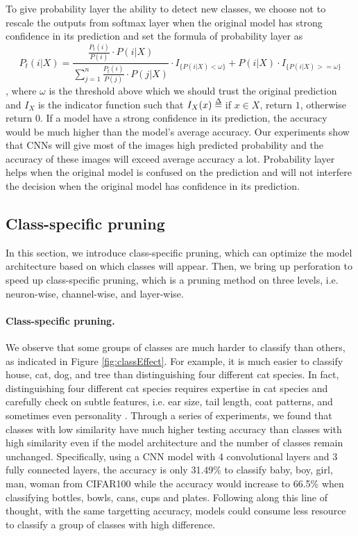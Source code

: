 \documentclass[pageno]{jpaper}
\def\delequal{\mathrel{\ensurestackMath{\stackon[1pt]{=}{\scriptstyle\Delta}}}}
\begin{document}
To give probability layer the ability to detect new classes, we choose not to rescale the outputs from softmax layer when the original model has strong confidence in its prediction and set the formula of probability layer as
\begin{equation} \label{eq: recover}
    P_t(i|X) = \frac{\frac{P_t(i)}{P(i)} \cdot P(i|X)}{\sum_{j=1}^n \frac{P_t(i)}{P(j)} \cdot P(j|X)} \cdot I_{\{P(i|X) < \omega\}} + P(i|X) \cdot I_{\{P(i|X) >= \omega\}} 
\end{equation}
, where $\omega$ is the threshold above which we should trust the original prediction and $I_X$ is the indicator function such that
$I_X(x) \delequal \; $if $x\in X$, return $1$, otherwise return $0$.
If a model have a strong confidence in its prediction, the accuracy would be much higher than the model's average accuracy. Our experiments show that CNNs will give most of the images high predicted probability and the accuracy of these images will exceed average accuracy a lot. Probability layer helps when the original model is confused on the prediction and will not interfere the decision when the original model has confidence in its prediction.




\subsection{Class-specific pruning}
In this section, we introduce class-specific pruning, which can optimize the model architecture based on which classes will appear. Then, we bring up perforation to speed up class-specific pruning, which is a pruning method on three levels, i.e. neuron-wise, channel-wise, and layer-wise.


\paragraph{Class-specific pruning.} 
We observe that some groups of classes are much harder to classify than others, as indicated in Figure \ref{fig:classEffect}. For example, it is much easier to classify house, cat, dog, and tree than distinguishing four different cat species. In fact, distinguishing four different cat species requires expertise in cat species and carefully check on subtle features, i.e. ear size, tail length, coat patterns, and sometimes even personality \cite{cat2018}. Through a series of experiments, we found that classes with low similarity have much higher testing accuracy than classes with high similarity even if the model architecture and the number of classes remain unchanged. Specifically, using a CNN model with 4 convolutional layers and 3 fully connected layers, the accuracy is only 31.49\% to classify baby, boy, girl, man, woman from CIFAR100 while the accuracy would increase to 66.5\% when classifying bottles, bowls, cans, cups and plates. Following along this line of thought, with the same targetting accuracy, models could consume less resource to classify a group of classes with high difference. 
\end{document}
